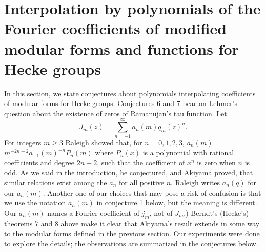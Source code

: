 \documentclass{article}
\begin{document}
\section[]{Interpolation by polynomials of 
the Fourier coefficients of modified 
modular forms and functions for Hecke groups}
In this section, we state conjectures about
polynomials interpolating coefficients of
modular forms for Hecke groups.
Conjectures 6 and 7
bear on Lehmer's question about
the existence of zeros of Ramanujan's
tau function.
\newline \newline \noindent
Let 
$$
J_m(z) = 
\sum_{n = -1}^{\infty}a_n(m) q_m(z)^n.
$$
For integers $m \geq 3$ 
Raleigh showed that,
for $n = 0, 1, 2, 3$, 
$a_n(m) = $
\newline
$m^{-2n-2} a_{-1}(m)^{-n} P_n(m)$
where $P_n(x)$ is a polynomial with rational
coefficients and degree $2n+2$,
such that the coefficient of $x^n$
is zero when $n$ is odd.
As we said in the introduction,
he conjectured, and Akiyama proved,
that similar relations
exist among the $a_n$ for 
all positive $n$.
\newline \newline \noindent
Raleigh writes $a_n(q)$ for our
$a_n(m)$.
Another one of our choices that 
may pose a risk of confusion is that
we use the notation $a_n(m)$ in conjecture 1
below, but the meaning is different.
Our $a_n(m)$ names a Fourier 
coefficient of $j_m$,
not of $J_m$.)
\newline \newline \noindent
Berndt's (Hecke's) theorems
7 and 8 above make it clear that 
 Akiyama's result 
extends in some way to the 
modular forms defined in
the previous section. Our
experiments were done to
explore the details; 
the observations are summarized
in the conjectures below.
\newline \newline \noindent
\end{document}
